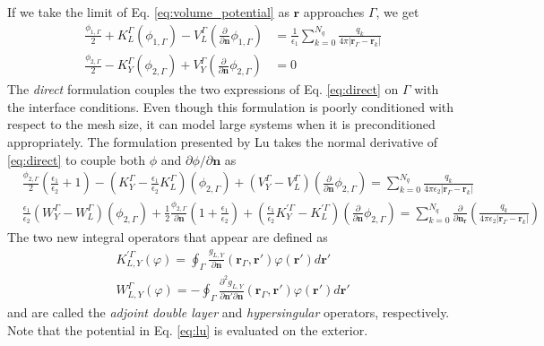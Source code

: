 If we take the limit of Eq. \eqref{eq:volume_potential} as $\mathbf{r}$ approaches $\Gamma$, we get
%
\begin{align} \label{eq:direct}
\frac{\phi_{1,\Gamma}}{2}+ K_{L}^{\Gamma}(\phi_{1,\Gamma}) -  V_{L}^{\Gamma} \left(\frac{\partial}{\partial \mathbf{n}}  \phi_{1,\Gamma}  \right) & = \frac{1}{\epsilon_1} \sum_{k=0}^{N_q}  \frac{q_k}{4\pi|\mathbf{r}_{\Gamma} - \mathbf{r}_k|} \nonumber \\
\frac{\phi_{2,\Gamma}}{2} - K_{Y}^{\Gamma}(\phi_{2,\Gamma}) + V_{Y}^{\Gamma} \left( \frac{\partial}{\partial \mathbf{n}} \phi_{2,\Gamma} \right) & = 0
\end{align}
%
The {\it direct} formulation\cite{YoonLenhoff1991} couples the two expressions of Eq. \eqref{eq:direct} on $\Gamma$ with the interface conditions. Even though this formulation is poorly conditioned with respect to the mesh size, it can model large systems when it is preconditioned appropriately.\cite{AltmanBardhanWhiteTidor09,WangCooperBetckeBarba2021} 
The formulation presented by Lu\cite{LuETal2006} takes the normal derivative of \eqref{eq:direct} to couple both $\phi$ and $\partial\phi/\partial\mathbf{n}$ as
%
\begin{align}\label{eq:lu}
    & \frac{\phi_{2,\Gamma}}{2}\left(\frac{\epsilon_1}{\epsilon_2}+1\right) - \left(K_Y^\Gamma - \frac{\epsilon_1}{\epsilon_2}K_L^\Gamma\right)(\phi_{2,\Gamma}) + \left(V_Y^\Gamma - V_L^\Gamma\right)\left( \frac{\partial}{\partial \mathbf{n}} \phi_{2,\Gamma} \right) = \sum_{k=0}^{N_q}  \frac{q_k}{4\pi\epsilon_2|\mathbf{r}_{\Gamma} - \mathbf{r}_k|}
     \nonumber \\
    &\frac{\epsilon_1}{\epsilon_2}\left(W_Y^\Gamma - W_L^\Gamma\right)(\phi_{2,\Gamma}) +  \frac{1}{2}\frac{\phi_{2,\Gamma}}{\partial\mathbf{n}}\left(1+\frac{\epsilon_1}{\epsilon_2}\right) + \left(\frac{\epsilon_1}{\epsilon_2}K_Y^{\prime\Gamma} - K_L^{\prime\Gamma}\right)\left( \frac{\partial}{\partial \mathbf{n}} \phi_{2,\Gamma} \right) = \sum_{k=0}^{N_q}  \frac{\partial}{\partial\mathbf{n}_\mathbf{r}}\left(\frac{q_k}{4\pi\epsilon_2|\mathbf{r}_{\Gamma} - \mathbf{r}_k|}\right)
\end{align}
%
The two new integral operators that appear are defined as 
%
\begin{align}\label{eq:adj_hyp}
K^{\prime\Gamma}_{L,Y}(\varphi) = \oint_\Gamma \frac{g_{L,Y}}{\partial\mathbf{n}}(\mathbf{r}_\Gamma,\mathbf{r}')\varphi(\mathbf{r}')d\mathbf{r}'\nonumber\\
W^\Gamma_{L,Y}(\varphi) = - \oint_\Gamma \frac{\partial^2 g_{L,Y}}{\partial\mathbf{n}'\partial\mathbf{n}}(\mathbf{r}_\Gamma,\mathbf{r}')\varphi(\mathbf{r}')d\mathbf{r}'
\end{align}
%
and are called the {\it  adjoint double layer} and {\it hypersingular} operators, respectively. Note that the potential in Eq. \eqref{eq:lu} is evaluated on the exterior. 

